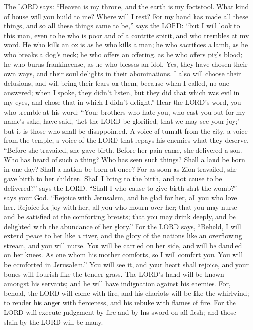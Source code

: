  The LORD says: ``Heaven is my throne, and the earth is my
footstool. What kind of house will you build to me? Where will I rest?
 For my hand has made all these things, and so all these
things came to be,'' says the LORD: ``but I will look to this man, even
to he who is poor and of a contrite spirit, and who trembles at my word.
 He who kills an ox is as he who kills a man; he who
sacrifices a lamb, as he who breaks a dog's neck; he who offers an
offering, as he who offers pig's blood; he who burns frankincense, as he
who blesses an idol. Yes, they have chosen their own ways, and their
soul delights in their abominations.  I also will choose
their delusions, and will bring their fears on them, because when I
called, no one answered; when I spoke, they didn't listen, but they did
that which was evil in my eyes, and chose that in which I didn't
delight.''  Hear the LORD's word, you who tremble at his
word: ``Your brothers who hate you, who cast you out for my name's sake,
have said, `Let the LORD be glorified, that we may see your joy;' but it
is those who shall be disappointed.  A voice of tumult
from the city, a voice from the temple, a voice of the LORD that repays
his enemies what they deserve.  ``Before she travailed,
she gave birth. Before her pain came, she delivered a son.
 Who has heard of such a thing? Who has seen such things?
Shall a land be born in one day? Shall a nation be born at once? For as
soon as Zion travailed, she gave birth to her children. 
Shall I bring to the birth, and not cause to be delivered?'' says the
LORD. ``Shall I who cause to give birth shut the womb?'' says your God.
 ``Rejoice with Jerusalem, and be glad for her, all you
who love her. Rejoice for joy with her, all you who mourn over her;
 that you may nurse and be satisfied at the comforting
breasts; that you may drink deeply, and be delighted with the abundance
of her glory.''  For the LORD says, ``Behold, I will
extend peace to her like a river, and the glory of the nations like an
overflowing stream, and you will nurse. You will be carried on her side,
and will be dandled on her knees.  As one whom his mother
comforts, so I will comfort you. You will be comforted in Jerusalem.''
 You will see it, and your heart shall rejoice, and your
bones will flourish like the tender grass. The LORD's hand will be known
amongst his servants; and he will have indignation against his enemies.
 For, behold, the LORD will come with fire, and his
chariots will be like the whirlwind; to render his anger with
fierceness, and his rebuke with flames of fire.  For the
LORD will execute judgement by fire and by his sword on all flesh; and
those slain by the LORD will be many.


